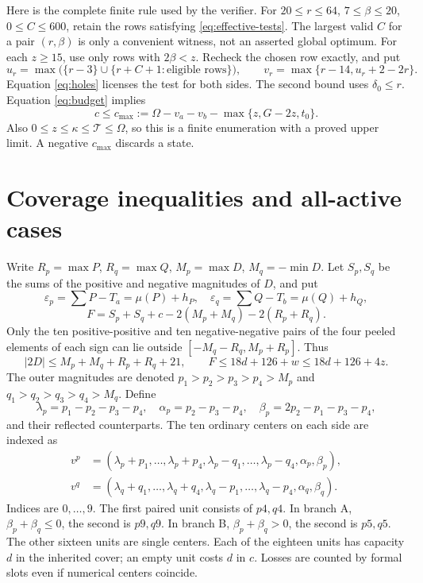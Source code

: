 \documentclass[11pt,a4paper]{article}
\newcommand{\T}{\mathcal T}
\begin{document}
Here is the complete finite rule used by the verifier. For
$20\le r\le64$, $7\le\beta\le20$, $0\le C\le600$, retain the rows
satisfying \eqref{eq:effective-tests}. The largest valid $C$ for a pair
$(r,\beta)$ is only a convenient witness, not an asserted global optimum.
For each $z\ge15$, use only rows with $2\beta<z$. Recheck the chosen
row exactly, and put
\[
 u_r=\max\bigl(\{r-3\}\cup\{r+C+1:\text{eligible rows}\}\bigr),
 \qquad v_r=\max\{r-14,u_r+2-2r\}.
\]
Equation \eqref{eq:holes} licenses the test for both sides. The second
bound uses $\delta_0\le r$. Equation \eqref{eq:budget} implies
\begin{equation}\label{eq:cmax}
 c\le c_{\max}:=\Omega-v_a-v_b-\max\{z,G-2z,t_0\}.
\end{equation}
Also $0\le z\le\kappa\le\T\le\Omega$, so this is a finite enumeration
with a proved upper limit. A negative $c_{\max}$ discards a state.

\section{Coverage inequalities and all-active cases}
Write $R_p=\max P$, $R_q=\max Q$, $M_p=\max D$, $M_q=-\min D$.
Let $S_p,S_q$ be the sums of the positive and negative magnitudes of $D$,
and put
\[
 \varepsilon_p=\sum P-T_a=\mu(P)+h_P,\quad
 \varepsilon_q=\sum Q-T_b=\mu(Q)+h_Q,
\]
\[
 F=S_p+S_q+c-2(M_p+M_q)-2(R_p+R_q).
\]
Only the ten positive-positive and ten negative-negative pairs of the
four peeled elements of each sign can lie outside
$[-M_q-R_q,M_p+R_p]$. Thus
\begin{equation}\label{eq:Fupper}
 |2D|\le M_p+M_q+R_p+R_q+21,\qquad
 F\le18d+126+w\le18d+126+4z.
\end{equation}
The outer magnitudes are denoted $p_1>p_2>p_3>p_4>M_p$ and
$q_1>q_2>q_3>q_4>M_q$. Define
\[
 \lambda_p=p_1-p_2-p_3-p_4,\quad
 \alpha_p=p_2-p_3-p_4,\quad
 \beta_p=2p_2-p_1-p_3-p_4,
\]
and their reflected counterparts. The ten ordinary centers on each side
are indexed as
\begin{align*}
 v^p&=(\lambda_p+p_1,\ldots,\lambda_p+p_4,
          \lambda_p-q_1,\ldots,\lambda_p-q_4,\alpha_p,\beta_p),\\
 v^q&=(\lambda_q+q_1,\ldots,\lambda_q+q_4,
          \lambda_q-p_1,\ldots,\lambda_q-p_4,\alpha_q,\beta_q).
\end{align*}
Indices are $0,\ldots,9$. The first paired unit consists of $p4,q4$.
In branch A, $\beta_p+\beta_q\le0$, the second is $p9,q9$.
In branch B, $\beta_p+\beta_q>0$, the second is $p5,q5$.
The other sixteen units are single centers. Each of the eighteen units
has capacity $d$ in the inherited cover; an empty unit costs $d$ in $c$.
Losses are counted by formal slots even if numerical centers coincide.
\end{document}
